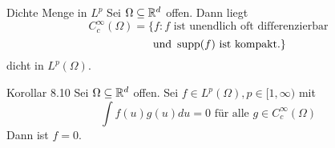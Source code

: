 	\begin{karte}{Dichte Menge in $L^{p}$}
		Sei $\Omega \subseteq \mathbb{R}^{d}$ offen. Dann liegt
		\[ C_{c}^{\infty}(\Omega) = \{ f : f \text{ ist unendlich oft differenzierbar} \]
		\[ \quad ~ ~ \text{ und } \operatorname{supp}(f) \text{ ist kompakt.} \} \]
		dicht in $L^{p}(\Omega)$.
	\end{karte}
		
	\begin{karte}{Korollar 8.10}
		Sei $\Omega \subseteq \mathbb{R}^{d}$ offen. Sei $f \in L^{p}(\Omega), p \in [1, \infty)$ mit
			\[ \int f(u) g(u) du = 0 \text{ für alle } g \in C_{c}^{\infty}(\Omega) \]
			Dann ist $f = 0$.
	\end{karte}	
